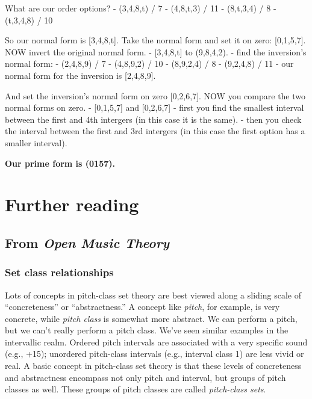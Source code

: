 \documentclass{book}
\begin{document}
What are our order options? - (3,4,8,t) / 7 - (4,8,t,3) / 11 - (8,t,3,4) / 8 -
(t,3,4,8) / 10

So our normal form is {[}3,4,8,t{]}. Take the normal form and set it on zero:
{[}0,1,5,7{]}. NOW invert the original normal form. - {[}3,4,8,t{]} to
(9,8,4,2). - find the inversion's normal form: - (2,4,8,9) / 7 - (4,8,9,2) /
10 - (8,9,2,4) / 8 - (9,2,4,8) / 11 - our normal form for the inversion is
{[}2,4,8,9{]}.

And set the inversion's normal form on zero {[}0,2,6,7{]}. NOW you compare the
two normal forms on zero. - {[}0,1,5,7{]} and {[}0,2,6,7{]} - first you find
the smallest interval between the first and 4th intergers (in this case it is
the same). - then you check the interval between the first and 3rd intergers
(in this case the first option has a smaller interval).

\textbf{Our prime form is (0157).}

\hypertarget{further-reading-29}{%
\chapter{Further reading}\label{further-reading-29}}

\hypertarget{from-open-music-theory-28}{%
\section{\texorpdfstring{From \emph{Open Music
Theory}}{From Open Music Theory}}\label{from-open-music-theory-28}}

\hypertarget{set-class-relationships}{%
\subsection{Set class relationships}\label{set-class-relationships}}

Lots of concepts in pitch-class set theory are best viewed along a sliding
scale of ``concreteness'' or ``abstractness.'' A concept like \emph{pitch},
for example, is very concrete, while \emph{pitch class} is somewhat more
abstract. We can perform a pitch, but we can't really perform a pitch class.
We've seen similar examples in the intervallic realm. Ordered pitch intervals
are associated with a very specific sound (e.g., +15); unordered pitch-class
intervals (e.g., interval class 1) are less vivid or real. A basic concept in
pitch-class set theory is that these levels of concreteness and abstractness
encompass not only pitch and interval, but groups of pitch classes as well.
These groups of pitch classes are called \emph{pitch-class sets}.
\end{document}
